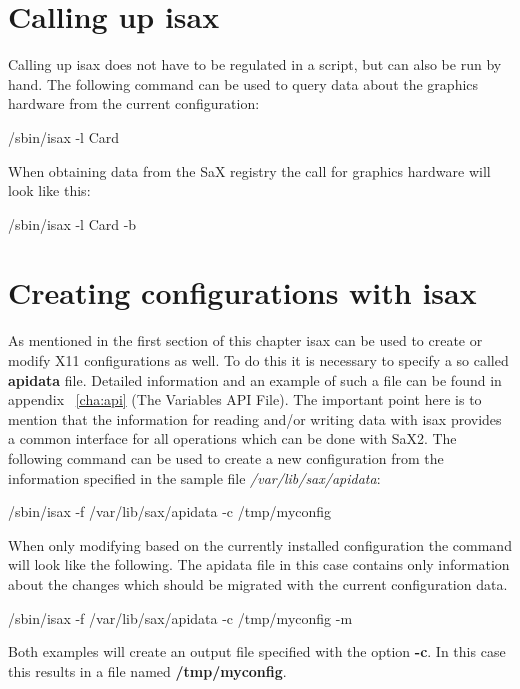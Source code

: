 \section{Calling up isax}
Calling up isax does not have to be regulated in a script, but can also be run
by hand. The following command can be used to query data about the graphics
hardware from the current configuration:

\begin{Command}{5cm}
/sbin/isax -l Card
\end{Command}

When obtaining data from the SaX registry the call for graphics hardware
will look like this:

\begin{Command}{5cm}
/sbin/isax -l Card -b
\end{Command}

\section{Creating configurations with isax}
As mentioned in the first section of this chapter isax can be used
to create or modify X11 configurations as well. To do this it is
necessary to specify a so called \textbf{apidata} file. Detailed
information and an example of such a file can be found in
appendix ~\ref{cha:api} (The Variables API File).
The important point here is to mention
that the information for reading and/or writing data with isax provides
a common interface for all operations which can be done with SaX2.
The following command can be used to create a new configuration
from the information specified in the sample file \textit{/var/lib/sax/apidata}:

\begin{Command}{11cm}
/sbin/isax -f /var/lib/sax/apidata -c /tmp/myconfig
\end{Command}

When only modifying based on the currently installed configuration
the command will look like the following. The apidata file in this case
contains only information about the changes which should be migrated
with the current configuration data.

\begin{Command}{11cm}
/sbin/isax -f /var/lib/sax/apidata -c /tmp/myconfig -m
\end{Command}

Both examples will create an output file specified with the option
\textbf{-c}. In this case this results in a file named
\textbf{/tmp/myconfig}.
